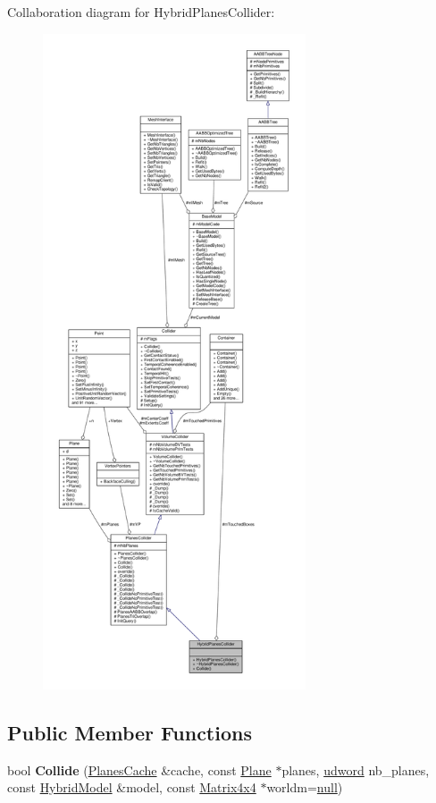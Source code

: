 Collaboration diagram for Hybrid\+Planes\+Collider\+:
\nopagebreak
\begin{figure}[H]
\begin{center}
\leavevmode
\includegraphics[height=550pt]{d0/dfd/classHybridPlanesCollider__coll__graph}
\end{center}
\end{figure}
\subsection*{Public Member Functions}
\begin{DoxyCompactItemize}
\item 
bool {\bfseries Collide} (\hyperlink{structPlanesCache}{Planes\+Cache} \&cache, const \hyperlink{classPlane}{Plane} $\ast$planes, \hyperlink{IceTypes_8h_a44c6f1920ba5551225fb534f9d1a1733}{udword} nb\+\_\+planes, const \hyperlink{classHybridModel}{Hybrid\+Model} \&model, const \hyperlink{classMatrix4x4}{Matrix4x4} $\ast$worldm=\hyperlink{IceTypes_8h_ac97b8ee753e4405397a42ad5799b0f9e}{null})\hypertarget{classHybridPlanesCollider_aeb4673000a3059f452ee8b48d81f5328}{}\label{classHybridPlanesCollider_aeb4673000a3059f452ee8b48d81f5328}

\end{DoxyCompactItemize}
